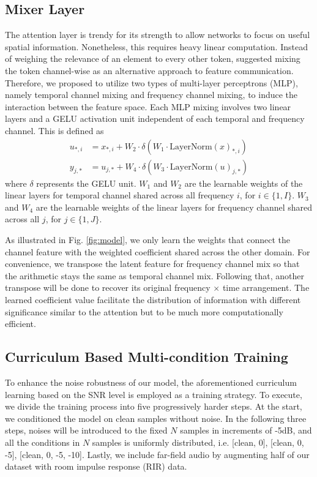 \documentclass{article}
\begin{document}
\subsection{Mixer Layer}
\label{ssec:convmixer}
The attention layer is trendy for its strength to allow networks to focus on useful spatial information. Nonetheless, this requires heavy linear computation. Instead of weighing the relevance of an element to every other token, \cite{lee2021fnet, tolstikhin2021mlp} suggested mixing the token channel-wise as an alternative approach to feature communication. Therefore, we proposed to utilize two types of multi-layer perceptrons (MLP), namely temporal channel mixing and frequency channel mixing, to induce the interaction between the feature space. Each MLP mixing involves two linear layers and a GELU activation unit independent of each temporal and frequency channel. This is defined as \begin{equation}
\begin{split}
\label{eq:4}
u_{*, i} &= x_{*, i} + W_2 \cdot \delta(W_1 \cdot \text{LayerNorm}(x)_{*, i}) \\
y_{j, *} &= u_{j, *} + W_4 \cdot \delta(W_3 \cdot \text{LayerNorm}(u)_{j, *})
\end{split}
\end{equation} where $\delta$ represents the GELU unit. $W_1$ and $W_2$ are the learnable weights of the linear layers for temporal channel shared across all frequency $i$, for $i \in \{1, I\}$. $W_3$ and $W_4$ are the learnable weights of the linear layers for frequency channel shared across all $j$, for $j \in \{1, J\}$.

As illustrated in Fig. \ref{fig:model}, we only learn the weights that connect the channel feature with the weighted coefficient shared across the other domain. For convenience, we transpose the latent feature for frequency channel mix so that the arithmetic stays the same as temporal channel mix. Following that, another transpose will be done to recover its original frequency $\times$ time arrangement. The learned coefficient value facilitate the distribution of information with different significance similar to the attention but to be much more computationally efficient. 

\subsection{Curriculum Based Multi-condition Training}
\label{ssec:curriculum}

To enhance the noise robustness of our model, the aforementioned curriculum learning based on the SNR level is employed as a training strategy.
To execute, we divide the training process into five progressively harder steps. At the start, we conditioned the model on clean samples without noise. In the following three steps, noises will be introduced to the fixed $N$ samples in increments of -5dB, and all the conditions in $N$ samples is uniformly distributed, i.e. [clean, 0], [clean, 0, -5], [clean, 0, -5, -10]. Lastly, we include far-field audio by augmenting half of our dataset with room impulse response (RIR) data.
\end{document}
